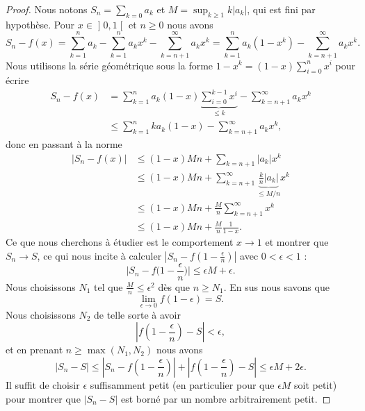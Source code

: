 \begin{proof}
	Nous notons \( S_n=\sum_{k=0}a_k\) et \( M=\sup_{k\geq 1}k| a_k |\), qui est fini par hypothèse. Pour \( x\in \mathopen] 0 , 1 \mathclose[\) et \( n\geq 0\) nous avons
	\begin{equation}
		S_n-f(x)=\sum_{k=1}^na_k-\sum_{k=1}^na_kx^k-\sum_{k=n+1}^{\infty}a_kx^k=\sum_{k=1}^na_k(1-x^k)-\sum_{k=n+1}^{\infty}a_kx^k.
	\end{equation}
	Nous utilisons la série géométrique sous la forme \( 1-x^k=(1-x)\sum_{i=0}^nx^i\) pour écrire
	\begin{subequations}
		\begin{align}
			S_n-f(x) & =\sum_{k=1}^na_k(1-x)\underbrace{\sum_{i=0}^{k-1}x^i}_{\leq k}-\sum_{k=n+1}^{\infty}a_kx^k \\
			         & \leq\sum_{k=1}^nka_k(1-x)-\sum_{k=n+1}^{\infty}a_kx^k,
		\end{align}
	\end{subequations}
	donc en passant à la norme
	\begin{subequations}
		\begin{align}
			\big| S_n-f(x) \big| & \leq (1-x)Mn+\sum_{k=n+1}| a_k |x^k                                                 \\
			                     & \leq (1-x)Mn+\sum_{k=n+1}^{\infty}\underbrace{\frac{ k }{ n }| a_k |}_{\leq M/n}x^k \\
			                     & \leq (1-x)Mn+\frac{ M }{ n }\sum_{k=n+1}^{\infty}x^k                                \\
			                     & \leq (1-x)Mn+\frac{ M }{ n }\frac{1}{ 1-x }.
		\end{align}
	\end{subequations}
	Ce que nous cherchons à étudier est le comportement \( x\to 1\) et montrer que \( S_n\to S\), ce qui nous incite à calculer \( | S_n-f(1-\frac{ \epsilon }{n  }) |\) avec \( 0<\epsilon<1\) :
	\begin{equation}
		\big| S_n-f\big( 1-\frac{ \epsilon }{ n } \big) \big|\leq \epsilon M+\epsilon.
	\end{equation}
	Nous choisissons \( N_1\) tel que \( \frac{ M }{ n }\leq \epsilon^2\) dès que \( n\geq N_1\). En sus nous savons que
	\begin{equation}
		\lim_{\epsilon\to 0}f(1-\epsilon)=S.
	\end{equation}
	Nous choisissons \( N_2\) de telle sorte à avoir
	\begin{equation}
		\left| f\left( 1-\frac{ \epsilon }{ n } \right)-S \right| <\epsilon,
	\end{equation}
	et en prenant \( n\geq\max(N_1,N_2)\) nous avons
	\begin{equation}
		| S_n-S |\leq \left| S_n-f\left( 1-\frac{ \epsilon }{ n } \right) \right| +\left| f\left( 1-\frac{ \epsilon }{ n } \right)-S \right|  \leq \epsilon M+2\epsilon.
	\end{equation}
	Il suffit de choisir \( \epsilon\) suffisamment petit (en particulier pour que \( \epsilon M\) soit petit) pour montrer que \( | S_n-S |\) est borné par un nombre arbitrairement petit.
\end{proof}



